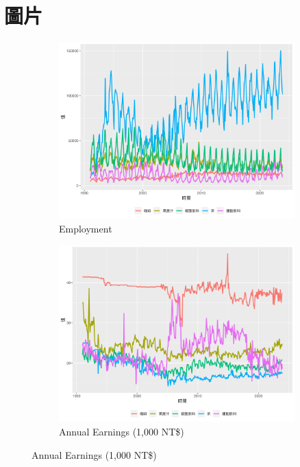 \section*{圖片}

\begin{figure}[H]  %
\begin{center}
\caption{Trend in Employment and Annual Earnings} \label{emp}
	\begin{subfigure}[b]{0.65\textwidth}
	 	\caption{Employment}\label{emp_e}
		\vspace{-0.85em}
	 	\includegraphics[width=\textwidth]{../outcome/chart1.png}  %
	 \end{subfigure}
	 \begin{subfigure}[b]{0.65\textwidth}
		\caption{Annual Earnings (1,000 NT\$)} \label{earnings}
		\vspace{-0.85em}
		\includegraphics[width=\textwidth]{../outcome/chart2.png}
	\end{subfigure}
\end{center}
\end{figure}
